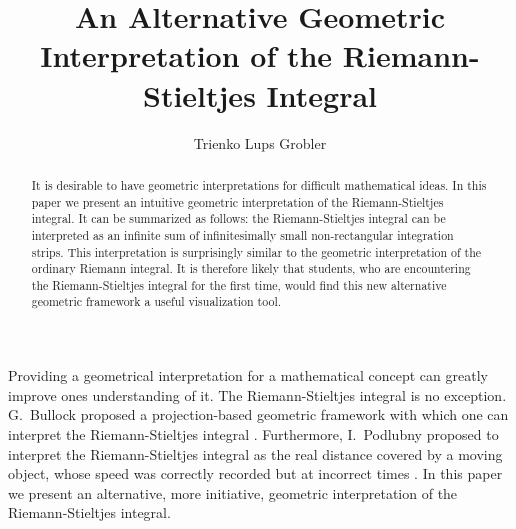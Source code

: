 \documentclass{article}
\theoremstyle{theorem}
\theoremstyle{definition}
\begin{document}
\title{An Alternative Geometric Interpretation of the Riemann-Stieltjes Integral}
\author{Trienko Lups Grobler}

\maketitle

\begin{abstract}
It is desirable to have geometric interpretations for difficult mathematical ideas. In this paper we present an intuitive geometric interpretation of the Riemann-Stieltjes integral. It can be 
summarized as follows: the Riemann-Stieltjes integral can be interpreted as an infinite sum of infinitesimally small non-rectangular 
integration strips. This interpretation is surprisingly similar to the geometric interpretation of the ordinary Riemann integral. 
It is therefore likely that students, who are encountering the Riemann-Stieltjes integral for the first time, would find this new alternative geometric framework a useful visualization tool.
\end{abstract}

\noindent
Providing a geometrical interpretation for a mathematical concept can greatly improve ones understanding of it. The Riemann-Stieltjes 
integral is no exception. G.~Bullock proposed a projection-based geometric framework with which one can interpret the Riemann-Stieltjes 
integral \cite{bullock1988}. Furthermore, I.~Podlubny proposed to interpret the Riemann-Stieltjes integral as the real distance covered by a moving object, whose speed was 
correctly recorded but at incorrect times \cite{podlubny2002}. In this paper we present an alternative, more initiative, geometric interpretation of the Riemann-Stieltjes integral.\\
\end{document}
